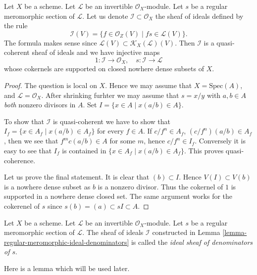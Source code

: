 \begin{lemma}
\label{lemma-regular-meromorphic-ideal-denominators}
Let $X$ be a scheme.
Let $\mathcal{L}$ be an invertible $\mathcal{O}_X$-module.
Let $s$ be a regular meromorphic section of $\mathcal{L}$.
Let us denote $\mathcal{I} \subset \mathcal{O}_X$ the
sheaf of ideals defined by the rule
$$
\mathcal{I}(V)
=
\{f \in \mathcal{O}_Z(V) \mid fs \in \mathcal{L}(V)\}.
$$
The formula makes sense since
$\mathcal{L}(V) \subset \mathcal{K}_X(\mathcal{L})(V)$.
Then $\mathcal{I}$ is a quasi-coherent sheaf of ideals and
we have injective maps
$$
1 : \mathcal{I} \longrightarrow \mathcal{O}_X,
\quad
s : \mathcal{I} \longrightarrow \mathcal{L}
$$
whose cokernels are supported on closed nowhere dense subsets of $X$.
\end{lemma}

\begin{proof}
The question is local on $X$.
Hence we may assume that $X = \text{Spec}(A)$,
and $\mathcal{L} = \mathcal{O}_X$. After shrinking furhter
we may assume that $s = x/y$ with $a, b \in A$ {\it both}
nonzero divisors in $A$. Set $I = \{x \in A \mid x(a/b) \in A\}$.

\medskip\noindent
To show that $\mathcal{I}$ is quasi-coherent we have to show
that $I_f = \{x \in A_f \mid x(a/b) \in A_f\}$ for every
$f \in A$. If $c/f^n \in A_f$, $(c/f^n)(a/b) \in A_f$, then we see
that $f^mc(a/b) \in A$ for some $m$, hence $c/f^n \in I_f$.
Conversely it is easy to see that $I_f$ is contained in
$\{x \in A_f \mid x(a/b) \in A_f\}$. This proves quasi-coherence.

\medskip\noindent
Let us prove the final statement. It is clear that $(b) \subset I$.
Hence $V(I) \subset V(b)$ is a nowhere dense subset as $b$ is
a nonzero divisor. Thus the cokernel of $1$ is supported in a nowhere
dense closed set. The same argument works for the cokerenel
of $s$ since $s(b) = (a) \subset sI \subset A$.
\end{proof}

\begin{definition}
\label{definition-regular-meromorphic-ideal-denominators}
Let $X$ be a scheme.
Let $\mathcal{L}$ be an invertible $\mathcal{O}_X$-module.
Let $s$ be a regular meromorphic section of $\mathcal{L}$.
The sheaf of ideals $\mathcal{I}$ constructed in
Lemma \ref{lemma-regular-meromorphic-ideal-denominators}
is called the {\it ideal sheaf of denominators of $s$}.
\end{definition}

\noindent
Here is a lemma which will be used later.

